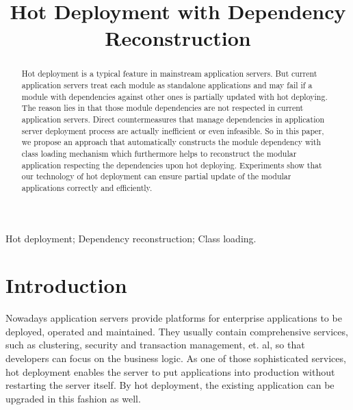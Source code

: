 \documentclass[conference]{IEEEtran}
\begin{document}
\title{Hot Deployment with Dependency Reconstruction}

\author{
}

\maketitle


\begin{abstract}
Hot deployment is a typical feature in mainstream application servers. But current application servers treat each module as standalone applications and may fail if a module with dependencies against other ones is partially updated with hot deploying. The reason lies in that those module dependencies are not respected in current application servers. Direct countermeasures that manage dependencies in application server deployment process are actually inefficient or even infeasible. So in this paper, we propose an approach that automatically constructs the module dependency with class loading mechanism which furthermore helps to reconstruct the modular application respecting the dependencies upon hot deploying. Experiments show that our technology of hot deployment can ensure partial update of the modular applications correctly and efficiently.
\end{abstract}

\begin{IEEEkeywords}
Hot deployment; Dependency reconstruction; Class loading.
\end{IEEEkeywords}


\IEEEpeerreviewmaketitle


\section{Introduction\label{sec:introduction}}

Nowadays application servers\cite{app_server} provide platforms for enterprise applications to be deployed, operated and maintained. They usually contain comprehensive services, such as clustering, security and transaction management, et. al, so that developers can focus on the business logic. As one of those sophisticated services, hot deployment enables the server to put applications into production without restarting the server itself. By hot deployment, the existing application can be upgraded in this fashion as well.
\end{document}
